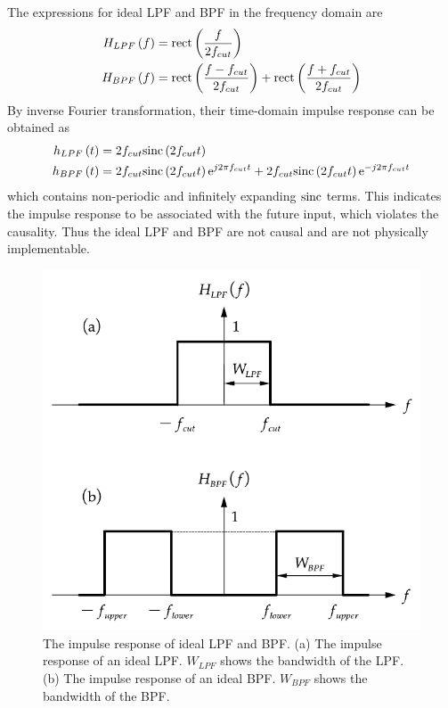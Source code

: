 \documentclass[../ECE459FinalProjectReport.tex]{subfiles}
\begin{document}
The expressions for ideal LPF and BPF in the frequency domain are
\begin{align}
    H_{LPF}\left(f\right) &= \text{rect}\left( \frac{f}{2f_{cut}} \right) \\
    H_{BPF}\left(f\right) &= \text{rect}\left( \frac{f-f_{cut}}{2f_{cut}} \right) + \text{rect}\left( \frac{f+f_{cut}}{2f_{cut}} \right)
\end{align}
By inverse Fourier transformation, their time-domain impulse response can be obtained as
\begin{align}
    h_{LPF}\left(t\right) &= 2f_{cut}\text{sinc}\left(2f_{cut} t\right) \\
    h_{BPF}\left(t\right) &= 2f_{cut}\text{sinc}\left(2f_{cut} t\right)\mathrm{e}^{j2\pi f_{cut} t} + 2f_{cut}\text{sinc}\left(2f_{cut} t\right)\mathrm{e}^{-j2\pi f_{cut} t}
\end{align}
which contains non-periodic and infinitely expanding $\text{sinc}$ terms. This indicates the impulse response to be associated with the future input, which violates the causality. Thus the ideal LPF and BPF are not causal and are not physically implementable.

\begin{figure}[tb]
    \centering
    \includegraphics[scale=0.6]{plots/ideal-filters.pdf}
    \caption{The impulse response of ideal LPF and BPF. (a) The impulse response of an ideal LPF. $W_{LPF}$ shows the bandwidth of the LPF. (b) The impulse response of an ideal BPF. $W_{BPF}$ shows the bandwidth of the BPF.}
    \label{fig:ideal-filter}
\end{figure}
\end{document}
